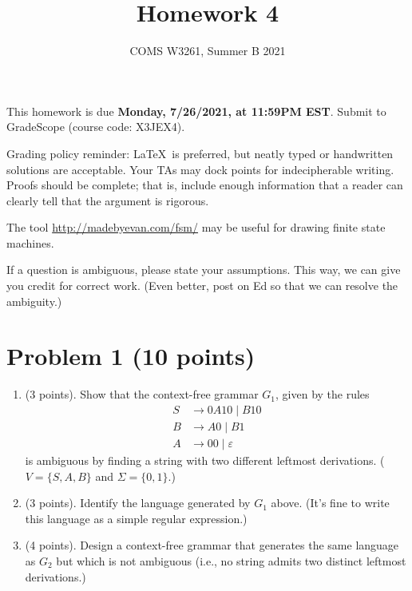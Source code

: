 \documentclass[letterpaper,11pt,twoside]{article}
\title{Homework 4}
\date{COMS W3261, Summer B 2021}
\theoremstyle{plain}
\theoremstyle{definition}
\theoremstyle{remark}
\theoremstyle{restate}
\begin{document}
\maketitle

This homework is due \textbf{Monday, 7/26/2021, at 11:59PM EST}. Submit to GradeScope (course code: X3JEX4).

Grading policy reminder: \LaTeX~is preferred, but neatly typed or handwritten solutions are acceptable. Your TAs may dock points for indecipherable writing. Proofs should be complete; that is, include enough information that a reader can clearly tell that the argument is rigorous.

The tool \url{http://madebyevan.com/fsm/} may be useful for drawing finite state machines.

If a question is ambiguous, please state your assumptions. This way, we can give you credit for correct work. (Even better, post on Ed so that we can resolve the ambiguity.)

\clearpage
\section{Problem 1 (10 points)}

\begin{enumerate}
    \item (3 points). Show that the context-free grammar $G_1$, given by the rules
    \begin{align*}
        S &\rightarrow 0A10 \; | \; B10 \\
        B &\rightarrow A0 \; | \; B1 \\
        A &\rightarrow 00 \; | \; \varepsilon
    \end{align*}
    is ambiguous by finding a string with two different leftmost derivations. ($V = \{S, A, B\}$ and $\Sigma=\{0,1\}$.)
    
    \item (3 points). Identify the language generated by $G_1$ above. (It's fine to write this language as a simple regular expression.)
    
    \item (4 points). Design a context-free grammar that generates the same language as $G_2$ but which is not ambiguous (i.e., no string admits two distinct leftmost derivations.) 
\end{enumerate}
\end{document}
